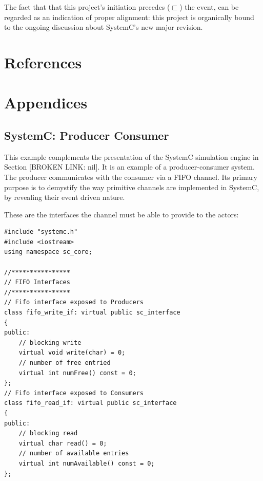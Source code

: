 \documentclass[11pt]{article}
\begin{document}
The fact that that this project's initiation precedes (\(\sqsubset\)) the event, can be regarded as an indication of proper alignment:
this project is organically bound to the ongoing discussion about SystemC's new major revision.

\clearpage

\section{References}
\label{sec:orgaa30eef}
\renewcommand\refname{}


\clearpage

\appendix
\section*{Appendices}
\renewcommand{\thesubsection}{\Alph{subsection}}
\subsection{SystemC: Producer Consumer}
\label{AppendixA}

This example complements the presentation of the SystemC simulation engine in Section [BROKEN LINK: nil].
It is an example of a producer-consumer system.
The producer communicates with the consumer via a FIFO channel.
Its primary purpose is to demystify the way primitive channels are implemented in SystemC, by revealing their event driven nature.

These are the interfaces the channel must be able to provide to the actors: 
\begin{verbatim}
#include "systemc.h"
#include <iostream>
using namespace sc_core;

//****************
// FIFO Interfaces
//****************
// Fifo interface exposed to Producers
class fifo_write_if: virtual public sc_interface
{
public:
    // blocking write
    virtual void write(char) = 0;
    // number of free entried
    virtual int numFree() const = 0;
};
// Fifo interface exposed to Consumers
class fifo_read_if: virtual public sc_interface
{
public:
    // blocking read
    virtual char read() = 0;
    // number of available entries
    virtual int numAvailable() const = 0;
};
\end{verbatim}
\end{document}
